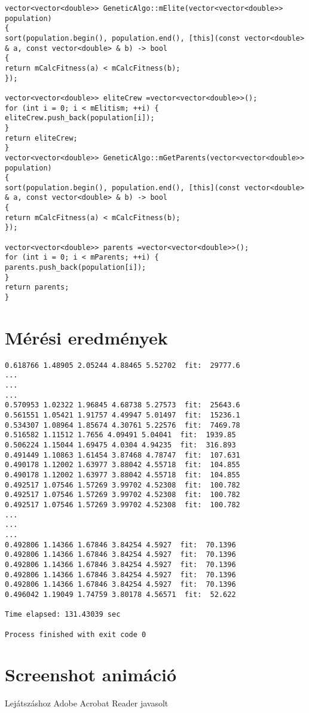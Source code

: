 \documentclass[12pt,a4paper,oneside]{report}
\begin{document}
\begin{lstlisting}
vector<vector<double>> GeneticAlgo::mElite(vector<vector<double>> population)
{
sort(population.begin(), population.end(), [this](const vector<double> & a, const vector<double> & b) -> bool
{
return mCalcFitness(a) < mCalcFitness(b);
});

vector<vector<double>> eliteCrew =vector<vector<double>>();
for (int i = 0; i < mElitism; ++i) {
eliteCrew.push_back(population[i]);
}
return eliteCrew;
}
vector<vector<double>> GeneticAlgo::mGetParents(vector<vector<double>> population)
{
sort(population.begin(), population.end(), [this](const vector<double> & a, const vector<double> & b) -> bool
{
return mCalcFitness(a) < mCalcFitness(b);
});

vector<vector<double>> parents =vector<vector<double>>();
for (int i = 0; i < mParents; ++i) {
parents.push_back(population[i]);
}
return parents;
}
\end{lstlisting}

\section*{Mérési eredmények}
  \begin{lstlisting}
0.618766 1.48905 2.05244 4.88465 5.52702  fit:  29777.6
...
...
...
0.570953 1.02322 1.96845 4.68738 5.27573  fit:  25643.6
0.561551 1.05421 1.91757 4.49947 5.01497  fit:  15236.1
0.534307 1.08964 1.85674 4.30761 5.22576  fit:  7469.78
0.516582 1.11512 1.7656 4.09491 5.04041  fit:  1939.85
0.506224 1.15044 1.69475 4.0304 4.94235  fit:  316.893
0.491449 1.10863 1.61454 3.87468 4.78747  fit:  107.631
0.490178 1.12002 1.63977 3.88042 4.55718  fit:  104.855
0.490178 1.12002 1.63977 3.88042 4.55718  fit:  104.855
0.492517 1.07546 1.57269 3.99702 4.52308  fit:  100.782
0.492517 1.07546 1.57269 3.99702 4.52308  fit:  100.782
0.492517 1.07546 1.57269 3.99702 4.52308  fit:  100.782
...
...
...
0.492806 1.14366 1.67846 3.84254 4.5927  fit:  70.1396
0.492806 1.14366 1.67846 3.84254 4.5927  fit:  70.1396
0.492806 1.14366 1.67846 3.84254 4.5927  fit:  70.1396
0.492806 1.14366 1.67846 3.84254 4.5927  fit:  70.1396
0.492806 1.14366 1.67846 3.84254 4.5927  fit:  70.1396
0.496042 1.19049 1.74759 3.80178 4.56571  fit:  52.622

Time elapsed: 131.43039 sec

Process finished with exit code 0
\end{lstlisting}

\section*{Screenshot animáció}
Lejátszáshoz Adobe Acrobat Reader javasolt\newline
{}
\end{document}
